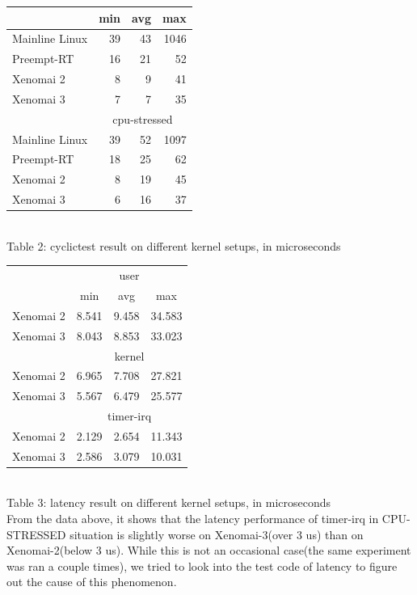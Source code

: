 \documentclass[10pt,a4paper]{article}
\begin{document}
\begin{multicols}{2}
\begin{tabular}{|l|r|r|r|}
 & \multicolumn{1}{l|}{min} & \multicolumn{1}{l|}{avg} & \multicolumn{1}{l|}{max} \\ \hline
Mainline Linux & 39 & 43 & 1046  \\ \hline
Preempt-RT & 16 & 21 & 52 \\ \hline
Xenomai 2 & 8 & 9 & 41 \\ \hline
Xenomai 3 & 7 & 7 & 35 \\ \hline
 & \multicolumn{3}{c|}{cpu-stressed} \\ \hline
Mainline Linux & 39 & 52 & 1097 \\ \hline
Preempt-RT & 18 & 25 & 62 \\ \hline
Xenomai 2 & 8 & 19 & 45 \\ \hline
Xenomai 3 & 6 & 16 & 37 \\ \hline
\end{tabular}\\
Table 2: cyclictest result on different kernel setups, in microseconds\\
\begin{tabular}{|l|c|r|r|}
\hline
\multirow{2}{*}{} & \multicolumn{3}{c|}{user} \\ \cline{2-4} 
 & min & \multicolumn{1}{c|}{avg} & \multicolumn{1}{c|}{max} \\ \hline
Xenomai 2 & 8.541 & 9.458 & 34.583 \\ \hline
Xenomai 3 & 8.043 & 8.853 & 33.023 \\ \hline
& \multicolumn{3}{c|}{kernel}      \\ \hline
Xenomai 2 & 6.965 & 7.708 & 27.821 \\ \hline
Xenomai 3 & 5.567 & 6.479 & 25.577 \\ \hline
& \multicolumn{3}{c|}{timer-irq}   \\ \hline
Xenomai 2 & 2.129 & 2.654 & 11.343 \\ \hline
Xenomai 3 & 2.586 & 3.079 & 10.031 \\ \hline
\end{tabular} \\
Table 3: latency result on different kernel setups, in microseconds\\




From the data above, it shows that the latency performance of timer-irq in CPU-STRESSED situation is slightly worse on Xenomai-3(over 3 us) than on Xenomai-2(below 3 us). While this is not an occasional case(the same experiment was ran a couple times), we tried to look into the test code of latency to figure out the cause of this phenomenon.


\end{multicols}
\end{document}
